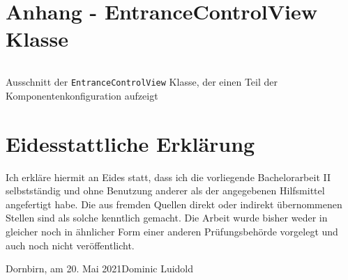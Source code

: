 \documentclass[a4paper,12pt,twoside]{scrreprt}
\begin{document}
\chapter*{Anhang - EntranceControlView Klasse}
\label{appendix:entrance-control-view-class}
\begin{listing}[H]
    \inputminted[fontsize=\footnotesize,linenos,breaklines]{java}{code/Luidold_Results-Vaadin-Components-CodeSample.java}
    \caption[Ausschnitt der \texttt{EntranceControlView} Klasse, der einen Teil der Komponentenkonfiguration aufzeigt]{Ausschnitt der \texttt{EntranceControlView} Klasse, der einen Teil der Komponentenkonfiguration aufzeigt}
    \label{code:results-vaadin-components}
\end{listing}

\chapter*{Eidesstattliche Erklärung}
Ich erkläre hiermit an Eides statt, dass ich die vorliegende Bachelorarbeit II selbstständig und ohne Benutzung anderer als der angegebenen Hilfsmittel angefertigt habe. Die aus fremden Quellen direkt oder indirekt übernommenen Stellen sind als solche kenntlich gemacht. Die Arbeit wurde bisher weder in gleicher noch in ähnlicher Form einer anderen Prüfungsbehörde vorgelegt und auch noch nicht veröffentlicht.

\vspace{5cm}
\noindent
Dornbirn, am 20. Mai 2021\hfill Dominic Luidold
\end{document}
